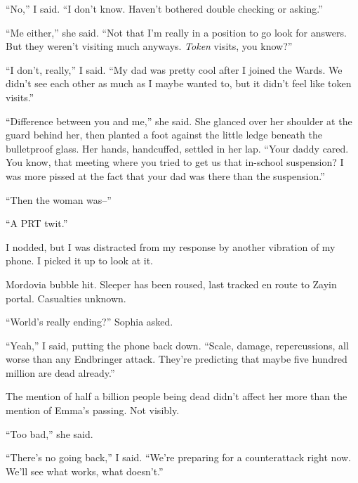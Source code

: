 ``No,'' I said.  ``I don't know.  Haven't bothered double checking or asking.''



``Me either,'' she said.  ``Not that I'm really in a position to go look for answers.  But they weren't visiting much anyways.  \emph{Token} visits, you know?''



``I don't, really,'' I said.  ``My dad was pretty cool after I joined the Wards.  We didn't see each other as much as I maybe wanted to, but it didn't feel like token visits.''



``Difference between you and me,'' she said.  She glanced over her shoulder at the guard behind her, then planted a foot against the little ledge beneath the bulletproof glass.  Her hands, handcuffed, settled in her lap.  ``Your daddy cared.  You know, that meeting where you tried to get us that in-school suspension?  I was more pissed at the fact that your dad was there than the suspension.''



``Then the woman was--''



``A PRT twit.''



I nodded, but I was distracted from my response by another vibration of my phone.  I picked it up to look at it.



Mordovia bubble hit.  Sleeper has been roused, last tracked en route to Zayin portal.  Casualties unknown.



``World's really ending?''  Sophia asked.



``Yeah,'' I said, putting the phone back down.  ``Scale, damage, repercussions, all worse than any Endbringer attack.  They're predicting that maybe five hundred million are dead already.''



The mention of half a billion people being dead didn't affect her more than the mention of Emma's passing.  Not visibly.



``Too bad,'' she said.



``There's no going back,'' I said.  ``We're preparing for a counterattack right now.  We'll see what works, what doesn't.''



